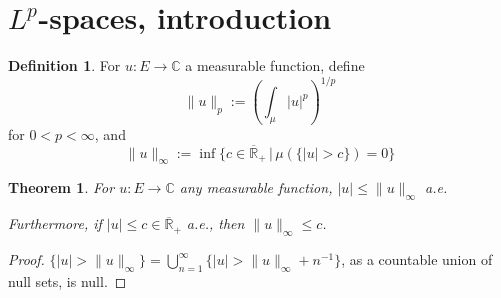 \documentclass[11pt, a4paper, openany]{book}
\newtheorem{thm}{Theorem}\newtheorem{lem}{Lemma}\newtheorem{crl}{Corollary}
\theoremstyle{definition}
\newtheorem{define}{Definition}\newtheorem{exam}{Example}\newtheorem{remark}{Remark}
\newcommand{\er}{\overline{\mathbb{R}}}
\begin{document}
\section{\texorpdfstring{$L^p$}{Lp}-spaces, introduction}
    \begin{define}
        For $u:E\rightarrow \mathbb{C}$ a measurable function, define
        \[
            \|u\|_p:=\left(\int_\mu |u|^p\right)^{1/p}
        \]
        for $0<p<\infty$, and
        \[
            \|u\|_\infty:=\inf{\{c\in\er_+\,|\,\mu(\{|u|> c\})=0\}}
        \]
    \end{define}
    \begin{thm}\label{reformulation of essential supremum}
        For $u:E\rightarrow \mathbb{C}$ any measurable function, $|u|\leqslant \|u\|_\infty$ a.e.
        
        Furthermore, if $|u|\leqslant c\in\er_+$ a.e., then $\|u\|_\infty\leqslant c$.
    \end{thm}
    \begin{proof}
        $\{|u|>\|u\|_\infty\}=\bigcup_{n=1}^\infty \{|u|>\|u\|_\infty+n^{-1}\}$, as a countable union of null sets, is null.
    \end{proof}
\end{document}
